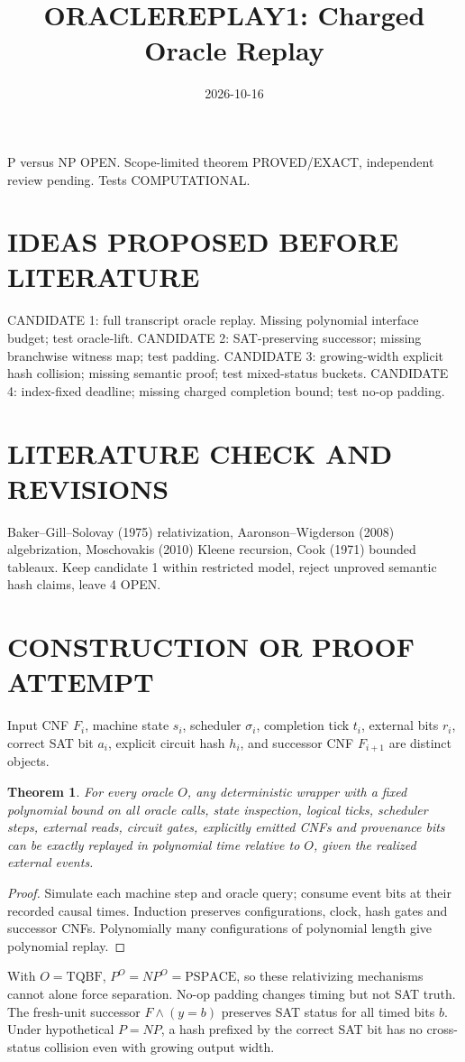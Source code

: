 \documentclass{article}
\title{ORACLEREPLAY1: Charged Oracle Replay}
\date{2026-10-16}
\newtheorem{theorem}{Theorem}
\begin{document}
\maketitle
P versus NP OPEN. Scope-limited theorem PROVED/EXACT, independent review pending. Tests COMPUTATIONAL.
\section{IDEAS PROPOSED BEFORE LITERATURE}
CANDIDATE 1: full transcript oracle replay. Missing polynomial interface budget; test oracle-lift. CANDIDATE 2: SAT-preserving successor; missing branchwise witness map; test padding. CANDIDATE 3: growing-width explicit hash collision; missing semantic proof; test mixed-status buckets. CANDIDATE 4: index-fixed deadline; missing charged completion bound; test no-op padding.
\section{LITERATURE CHECK AND REVISIONS}
Baker--Gill--Solovay (1975) relativization, Aaronson--Wigderson (2008) algebrization, Moschovakis (2010) Kleene recursion, Cook (1971) bounded tableaux. Keep candidate 1 within restricted model, reject unproved semantic hash claims, leave 4 OPEN.
\section{CONSTRUCTION OR PROOF ATTEMPT}
Input CNF $F_i$, machine state $s_i$, scheduler $\sigma_i$, completion tick $t_i$, external bits $r_i$, correct SAT bit $a_i$, explicit circuit hash $h_i$, and successor CNF $F_{i+1}$ are distinct objects.
\begin{theorem}
For every oracle $O$, any deterministic wrapper with a fixed polynomial bound on all oracle calls, state inspection, logical ticks, scheduler steps, external reads, circuit gates, explicitly emitted CNFs and provenance bits can be exactly replayed in polynomial time relative to $O$, given the realized external events.
\end{theorem}
\begin{proof}
Simulate each machine step and oracle query; consume event bits at their recorded causal times. Induction preserves configurations, clock, hash gates and successor CNFs. Polynomially many configurations of polynomial length give polynomial replay.
\end{proof}
With $O=\mathrm{TQBF}$, $P^O=NP^O=\mathrm{PSPACE}$, so these relativizing mechanisms cannot alone force separation. No-op padding changes timing but not SAT truth. The fresh-unit successor $F\wedge(y=b)$ preserves SAT status for all timed bits $b$. Under hypothetical $P=NP$, a hash prefixed by the correct SAT bit has no cross-status collision even with growing output width.
\end{document}
